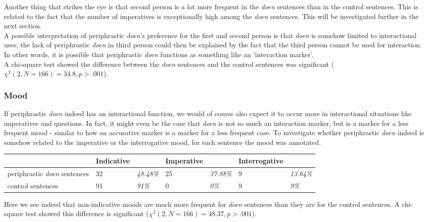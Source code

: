 \documentclass[12pt]{article}
\begin{document}
Another thing that strikes the eye is that second person is a lot more frequent in the \emph{doen} sentences than in the control sentences. This is related to the fact that the number of imperatives is exceptionally high among the \emph{doen} sentences. This will be investigated further in the next section.\\\indent
A possible interpretation of periphrastic \emph{doen}'s preference for the first and second person is that \emph{doen} is somehow limited to interactional uses; the lack of periphrastic \emph{doen} in third person could then be explained by the fact that the third person cannot be used for interaction. In other words, it is possible that periphrastic \emph{doen} functions as something like an 'interaction marker'.\\\indent
A chi-square test showed the difference between the \emph{doen} sentences and the control sentences was significant ($\chi^2(2, N=166) = 34.8, p > .001$).

\subsubsection{Mood}

If periphrastic \emph{doen} indeed has an interactional function, we would of course also expect it to occur more in interactional situations like imperatives and questions. In fact, it might even be the case that \emph{doen} is not so much an interaction marker, but is a marker for a less frequent mood - similar to how an accusative marker is a marker for a less frequent case. To investigate whether periphrastic \emph{doen} indeed is somehow related to the imperative or the interrogative mood, for each sentence the mood was annotated.

\begin{table}[h]
\begin{tabular}{|l||ll|ll|ll|}
\hline
&Indicative&&Imperative&&Interrogative&\\
\hline
periphrastic \emph{doen} sentences	&32 	& \emph{48.48\%}	&25		&\emph{37.88\%} & 9 &\emph{13.64\%}\\
control sentences					&91		& \emph{91\%}		&0	 	&\emph{0\%} 	& 9 &\emph{9\%}\\
\hline
\end{tabular}
\end{table}

Here we see indeed that non-indicative moods are much more frequent for \emph{doen} sentences than they are for the control sentences. A chi-square test showed this difference is significant ($\chi^2(2, N=166) = 48.37, p > .001$).
\end{document}
